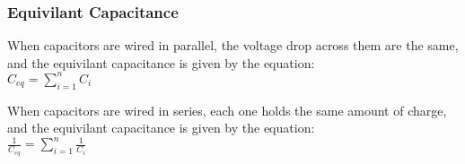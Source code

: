 \subsubsection*{Equivilant Capacitance}
\hspace{.5cm} When capacitors are wired in parallel, the voltage drop across them are the same, and the equivilant capacitance is given by the equation:\\
\vbox{
    \center
    $C_{eq} = \sum_{i=1}^{n} C_i$
}
\vspace{12pt}

\hspace{.5cm} When capacitors are wired in series, each one holds the same amount of charge, and the equivilant capacitance is given by the equation:\\
\vbox{
    \center
    $\frac{1}{C_{eq}} = \sum_{i=1}^{n} \frac{1}{C_i}$
}

